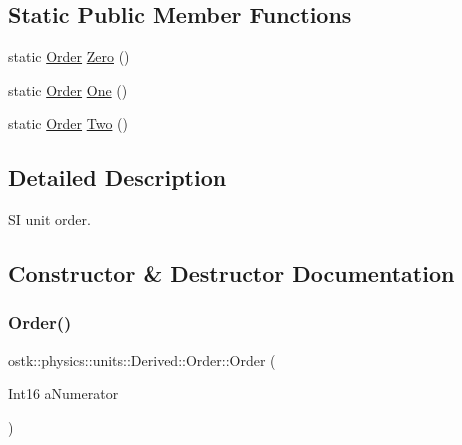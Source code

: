 \subsection*{Static Public Member Functions}
\begin{DoxyCompactItemize}
\item 
static \hyperlink{classostk_1_1physics_1_1units_1_1_derived_1_1_order}{Order} \hyperlink{classostk_1_1physics_1_1units_1_1_derived_1_1_order_a3d73f8e4264528130adfe7d596a2ac2b}{Zero} ()
\item 
static \hyperlink{classostk_1_1physics_1_1units_1_1_derived_1_1_order}{Order} \hyperlink{classostk_1_1physics_1_1units_1_1_derived_1_1_order_a77d03df2a944480e73a8ad924a7fc74d}{One} ()
\item 
static \hyperlink{classostk_1_1physics_1_1units_1_1_derived_1_1_order}{Order} \hyperlink{classostk_1_1physics_1_1units_1_1_derived_1_1_order_af648038964343ded058a13485511524c}{Two} ()
\end{DoxyCompactItemize}


\subsection{Detailed Description}
SI unit order. 

\subsection{Constructor \& Destructor Documentation}
\mbox{\label{classostk_1_1physics_1_1units_1_1_derived_1_1_order_a6e4bb9bce71558c4b9be69f8a0ad1bae}} 
\subsubsection{\texorpdfstring{Order()}{Order()}\hspace{0.1cm}{\footnotesize\ttfamily [1/2]}}
{\footnotesize\ttfamily ostk\+::physics\+::units\+::\+Derived\+::\+Order\+::\+Order (\begin{DoxyParamCaption}\item[{Int16}]{a\+Numerator }\end{DoxyParamCaption})}

